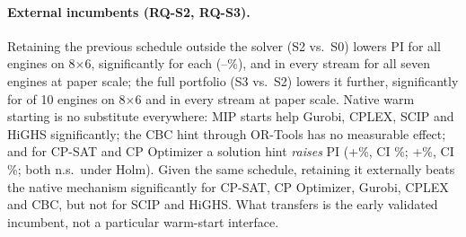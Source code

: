 \documentclass[letterpaper]{article} %
\begin{document}
\paragraph{External incumbents (RQ-S2, RQ-S3).} Retaining the previous schedule outside the solver (S2 vs.\ S0) lowers PI for all \MSBSSTwoVsSZeroEngines{} engines on 8$\times$6, significantly for each (\MSBSgurobiGurobiSTwoVsSZeroRel--\MSBScpoptimizerCpoptimizerSTwoVsSZeroRel\%), and in every stream for all seven engines at paper scale; the full portfolio (S3 vs.\ S2) lowers it further, significantly for \MSBSSThreeVsSTwoSig{} of 10 engines on 8$\times$6 and in every stream at paper scale. Native warm starting is no substitute everywhere: MIP starts help Gurobi, CPLEX, SCIP and HiGHS significantly; the CBC hint through OR-Tools has no measurable effect; and for CP-SAT and CP Optimizer a solution hint \emph{raises} PI (+\MSBScpsatCpsatSOneVsSZeroRel\%, CI \MSBScpsatCpsatSOneVsSZeroCIRel\%; +\MSBScpoptimizerCpoptimizerSOneVsSZeroRel\%, CI \MSBScpoptimizerCpoptimizerSOneVsSZeroCIRel\%; both n.s.\ under Holm). Given the same schedule, retaining it externally beats the native mechanism significantly for CP-SAT, CP Optimizer, Gurobi, CPLEX and CBC, but not for SCIP and HiGHS. What transfers is the early validated incumbent, not a particular warm-start interface.
\end{document}
